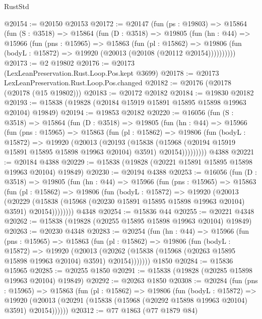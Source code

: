\begin{lexlean}{RustStd}
\begin{coremodule}
@20154 := @20150 @20153
@20172 := @20147
    (fun (ps : @19803) =>
    @15864
      (fun (S : @3518) =>
      @15864
        (fun (D : @3518) =>
        @19805
          (fun (hn : @44) =>
          @15966
            (fun (pns : @15965) =>
            @15863
              (fun (pl : @15862) =>
              @19806 (fun (bodyL : @15872) => @19920 (@20013 (@20108 (@20112 @20154))))))))))
@20173 := @2 @19802
@20176 := @20173 (LexLeanPreservation.Rust.Loop.Pos.kept @3699)
@20178 := @20173 LexLeanPreservation.Rust.Loop.Pos.changed
@20182 := @20176 (@20178 (@20178 (@15 @19802)))
@20183 := @20172 @20182
@20184 := @19830 @20182
@20193 := @15838 (@19828 (@20184 @15919 @15891 @15895 @15898 @19963 @20104) @19849)
@20194 := @19853 @20182
@20220 := @16056
    (fun (S : @3518) =>
    @15864
      (fun (D : @3518) =>
      @19805
        (fun (hn : @44) =>
        @15966
          (fun (pns : @15965) =>
          @15863
            (fun (pl : @15862) =>
            @19806
              (fun (bodyL : @15872) =>
              @19920
                (@20013
                  (@20193
                    (@15838
                      (@15968 (@20194 @15919 @15891 @15895 @15898 @19963 @20104) @3591)
                      @20154)))))))))
    @4388
@20221 := @20184 @4388
@20229 := @15838 (@19828 (@20221 @15891 @15895 @15898 @19963 @20104) @19849)
@20230 := @20194 @4388
@20253 := @16056
    (fun (D : @3518) =>
    @19805
      (fun (hn : @44) =>
      @15966
        (fun (pns : @15965) =>
        @15863
          (fun (pl : @15862) =>
          @19806
            (fun (bodyL : @15872) =>
            @19920
              (@20013
                (@20229
                  (@15838 (@15968 (@20230 @15891 @15895 @15898 @19963 @20104) @3591) @20154))))))))
    @4348
@20254 := @15836 @44
@20255 := @20221 @4348
@20262 := @15838 (@19828 (@20255 @15895 @15898 @19963 @20104) @19849)
@20263 := @20230 @4348
@20283 := @20254
    (fun (hn : @44) =>
    @15966
      (fun (pns : @15965) =>
      @15863
        (fun (pl : @15862) =>
        @19806
          (fun (bodyL : @15872) =>
          @19920
            (@20013
              (@20262 (@15838 (@15968 (@20263 @15895 @15898 @19963 @20104) @3591) @20154)))))))
    @1850
@20284 := @15836 @15965
@20285 := @20255 @1850
@20291 := @15838 (@19828 (@20285 @15898 @19963 @20104) @19849)
@20292 := @20263 @1850
@20308 := @20284
    (fun (pns : @15965) =>
    @15863
      (fun (pl : @15862) =>
      @19806
        (fun (bodyL : @15872) =>
        @19920 (@20013 (@20291 (@15838 (@15968 (@20292 @15898 @19963 @20104) @3591) @20154))))))
@20312 := @77 @1863 (@77 @1879 @84)

\end{coremodule}
\end{lexlean}
